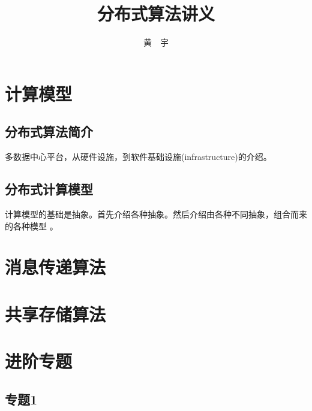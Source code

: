 \documentclass[UTF8]{ctexrep}
\begin{document}
\title{\Huge \bf 分布式算法讲义}

\author{黄\ \ 宇}

\maketitle

\tableofcontents

\part{计算模型}

\chapter{分布式算法简介}

\cite{Barroso18}

多数据中心平台，从硬件设施，到软件基础设施(infrastructure)的介绍。


\chapter{分布式计算模型}

计算模型的基础是抽象。首先介绍各种抽象。然后介绍由各种不同抽象，组合而来的各种模型 \cite{Cachin11}。


\part{消息传递算法}


\part{共享存储算法}


\part{进阶专题}


\chapter{专题1}
\end{document}
